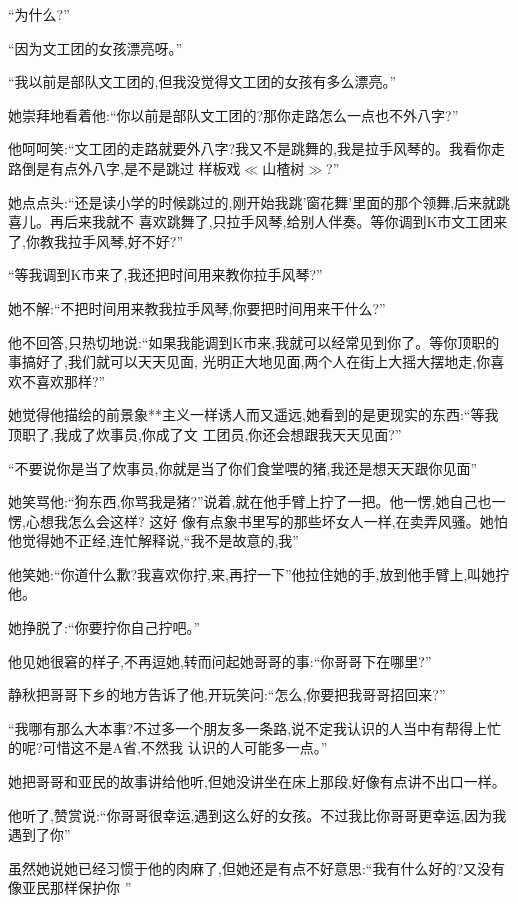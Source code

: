﻿\documentclass[12pt]{article}
\begin{document}
``为什么?''

``因为文工团的女孩漂亮呀。''


``我以前是部队文工团的,但我没觉得文工团的女孩有多么漂亮。''

她崇拜地看着他:``你以前是部队文工团的?那你走路怎么一点也不外八字?''

他呵呵笑:``文工团的走路就要外八字?我又不是跳舞的,我是拉手风琴的。我看你走路倒是有点外八字,是不是跳过
样板戏$\ll$山楂树$\gg$?''

她点点头:``还是读小学的时候跳过的,刚开始我跳'窗花舞'里面的那个领舞,后来就跳喜儿\myrule 。再后来我就不
喜欢跳舞了,只拉手风琴,给别人伴奏。等你调到K市文工团来了,你教我拉手风琴,好不好?''

``等我调到K市来了,我还把时间用来教你拉手风琴?''

她不解:``不把时间用来教我拉手风琴,你要把时间用来干什么?''

他不回答,只热切地说:``如果我能调到K市来,我就可以经常见到你了。等你顶职的事搞好了,我们就可以天天见面,
光明正大地见面,两个人在街上大摇大摆地走,你喜欢不喜欢那样?''

她觉得他描绘的前景象**主义一样诱人而又遥远,她看到的是更现实的东西:``等我顶职了,我成了炊事员,你成了文
工团员,你\myrule 还会想跟我天天见面?''

``不要说你是当了炊事员,你就是当了你们食堂喂的猪,我还是想天天跟你见面\myrule ''

她笑骂他:``狗东西,你骂我是猪?''说着,就在他手臂上拧了一把。他一愣,她自己也一愣,心想我怎么会这样? 这好
像有点象书里写的那些坏女人一样,在卖弄风骚。她怕他觉得她不正经,连忙解释说,``我不是故意的,我\myrule ''

他笑她:``你道什么歉?我喜欢你拧,来,再拧一下\myrule ''他拉住她的手,放到他手臂上,叫她拧他。

她挣脱了:``你要拧你自己拧吧。''

他见她很窘的样子,不再逗她,转而问起她哥哥的事:``你哥哥下在哪里?''

静秋把哥哥下乡的地方告诉了他,开玩笑问:``怎么,你要把我哥哥招回来?''

``我哪有那么大本事?不过多一个朋友多一条路,说不定我认识的人当中有帮得上忙的呢?可惜这不是A省,不然我
\myrule 认识的人可能多一点。''

她把哥哥和亚民的故事讲给他听,但她没讲坐在床上那段,好像有点讲不出口一样。

他听了,赞赏说:``你哥哥很幸运,遇到这么好的女孩。不过我比你哥哥更幸运,因为我\myrule 遇到了你\myrule ''

虽然她说她已经习惯于他的肉麻了,但她还是有点不好意思:``我\myrule 有什么好的?又没有像亚民那样保护你
\myrule ''
\end{document}
